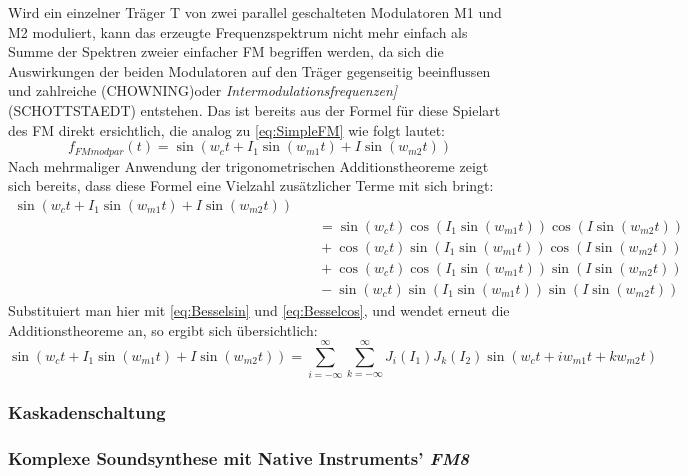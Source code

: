 Wird ein einzelner Träger T von zwei parallel geschalteten Modulatoren M1 und M2 moduliert, kann das erzeugte Frequenzspektrum nicht mehr einfach als Summe der Spektren zweier einfacher FM begriffen werden, da sich die Auswirkungen der beiden Modulatoren auf den Träger gegenseitig beeinflussen und zahlreiche  (CHOWNING)oder \textit{Intermodulationsfrequenzen]} (SCHOTTSTAEDT) entstehen. Das ist bereits aus der Formel für diese Spielart des FM direkt ersichtlich, die analog zu \ref{eq:SimpleFM} wie folgt lautet:
\begin{equation}
f_{FMmodpar}(t) = \sin(w_ct + I_1\sin(w_{m1}t) + I\sin(w_{m2}t))
\end{equation}
Nach mehrmaliger Anwendung der trigonometrischen Additionstheoreme zeigt sich bereits, dass diese Formel eine Vielzahl zusätzlicher Terme mit sich bringt:
\begin{equation}
\begin{split}
\sin(w_ct + I_1\sin(w_{m1}t) + I\sin(w_{m2}t)) \\ &\quad = \sin(w_ct)\cos(I_1\sin(w_{m1}t))\cos(I\sin(w_{m2}t)) \\ &\quad + \cos(w_ct)\sin(I_1\sin(w_{m1}t))\cos(I\sin(w_{m2}t)) \\ &\quad +\cos(w_ct)\cos(I_1\sin(w_{m1}t))\sin(I\sin(w_{m2}t)) \\ &\quad -\sin(w_ct)\sin(I_1\sin(w_{m1}t))\sin(I\sin(w_{m2}t))
\end{split}
\end{equation}
Substituiert man hier mit \ref{eq:Besselsin} und \ref{eq:Besselcos}, und wendet erneut die Additionstheoreme an, so ergibt sich übersichtlich:
\begin{equation}
\sin(w_ct + I_1\sin(w_{m1}t) + I\sin(w_{m2}t)) = \sum_{i=-\infty}^{\infty}\sum_{k=-\infty}^{\infty}J_i(I_1)J_k(I_2)\sin(w_ct + iw_{m1}t + kw_{m2}t)
\end{equation}



\subsubsection{Kaskadenschaltung}


\subsubsection{Komplexe Soundsynthese mit Native Instruments' \textit{FM8}}


